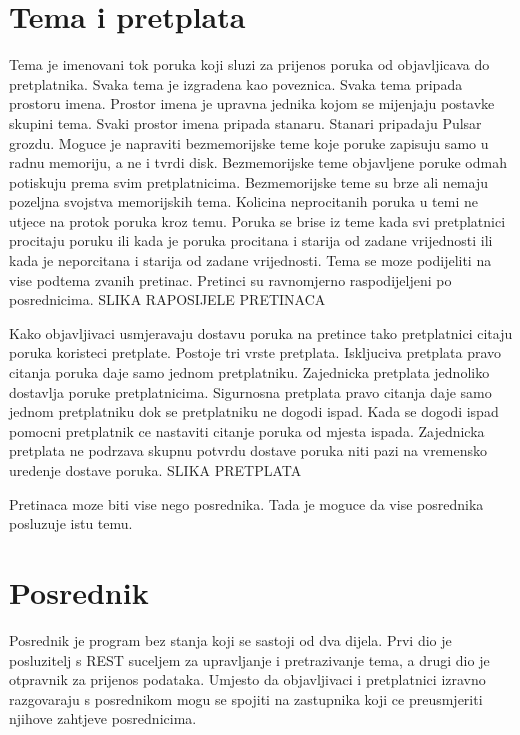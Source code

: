 \documentclass[times, utf8, diplomski, numeric]{fer}
\begin{document}
\chapter{Tema i pretplata}
Tema je imenovani tok poruka koji sluzi za prijenos poruka od objavljicava do pretplatnika. Svaka tema je izgradena kao poveznica. Svaka tema pripada prostoru imena. Prostor imena je upravna jednika kojom se mijenjaju postavke skupini tema. Svaki prostor imena pripada stanaru. Stanari pripadaju Pulsar grozdu. Moguce je napraviti bezmemorijske teme koje poruke zapisuju samo u radnu memoriju, a ne i tvrdi disk. Bezmemorijske teme objavljene poruke odmah potiskuju prema svim pretplatnicima. Bezmemorijske teme su brze ali nemaju pozeljna svojstva memorijskih tema. Kolicina neprocitanih poruka u temi ne utjece na protok poruka kroz temu. Poruka se brise iz teme kada svi pretplatnici procitaju poruku ili kada je poruka procitana i starija od zadane vrijednosti ili kada je neporcitana i starija od zadane vrijednosti. Tema se moze podijeliti na vise podtema zvanih pretinac. Pretinci su ravnomjerno raspodijeljeni po posrednicima. 
SLIKA RAPOSIJELE PRETINACA

Kako objavljivaci usmjeravaju dostavu poruka na pretince tako pretplatnici citaju poruka koristeci pretplate. Postoje tri vrste pretplata. Iskljuciva pretplata pravo citanja poruka daje samo jednom pretplatniku. Zajednicka pretplata jednoliko dostavlja poruke pretplatnicima. Sigurnosna pretplata pravo citanja daje samo jednom pretplatniku dok se pretplatniku ne dogodi ispad. Kada se dogodi ispad pomocni pretplatnik ce nastaviti citanje poruka od mjesta ispada. Zajednicka pretplata ne podrzava skupnu potvrdu dostave poruka niti pazi na vremensko uredenje dostave poruka.
SLIKA PRETPLATA




Pretinaca moze biti vise nego posrednika. Tada je moguce da vise posrednika posluzuje istu temu.





\chapter{Posrednik}
Posrednik je program bez stanja koji se sastoji od dva dijela. Prvi dio je posluzitelj s REST suceljem za upravljanje i pretrazivanje tema, a drugi dio je otpravnik za prijenos podataka. Umjesto da objavljivaci i pretplatnici izravno razgovaraju s posrednikom mogu se spojiti na zastupnika koji ce preusmjeriti njihove zahtjeve posrednicima.
\end{document}
